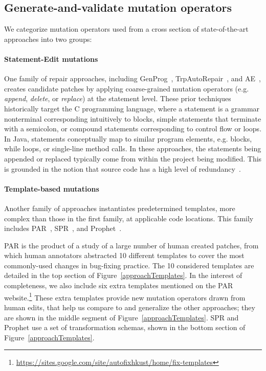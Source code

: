 \documentclass[conference]{IEEEtran}
\begin{document}
\subsection{Generate-and-validate mutation operators} 
\label{categorization}

We categorize mutation operators used from a cross
section of state-of-the-art approaches into two groups: 

\paragraph{Statement-Edit mutations}
One family of repair approaches, including GenProg~\cite{legoues12}, 
TrpAutoRepair~\cite{Qi13TrpAutoR}, and AE~\cite{Weimer13},
creates candidate 
patches by applying coarse-grained mutation operators (e.g. \emph{append}, \emph{delete}, or 
\emph{replace}) at the statement level. These prior techniques historically target the C programming language, where
a statement is a grammar nonterminal corresponding intuitively to blocks,
simple statements that terminate
with a semicolon, or compound statements corresponding to control flow or
loops. In Java, statements conceptually map to similar program elements, e.g. blocks,  while loops, or single-line
method calls. In these approaches, the statements being appended or replaced
typically come from within the project being modified. This is grounded in the
notion that source code has a high level of
redundancy~\cite{Hindle12Naturalness}. 

\paragraph{Template-based mutations}
Another family of approaches instantiates
predetermined templates, more complex than those in the first family, at applicable code locations.  This family includes PAR~\cite{kim2013}, 
SPR~\cite{long15SPR}, and 
Prophet~\cite{long16proph}.

PAR is the product of a study of a large number of 
human 
created patches, from which human annotators abstracted 10 different templates to cover
the most commonly-used changes in bug-fixing practice.
The 10 considered templates are detailed in the top section of Figure~\ref{approachTemplates}. In the interest of completeness, we also include six extra templates 
mentioned on the PAR website.\footnote{\url{https://sites.google.com/site/autofixhkust/home/fix-templates}} 
These extra templates provide new mutation operators drawn from human edits,
that help us compare to and
generalize the other approaches; they are shown in the middle segment of
Figure~\ref{approachTemplates}. 
SPR and Prophet use a set of transformation schemas,
shown in the bottom section of Figure~\ref{approachTemplates}.
\end{document}

